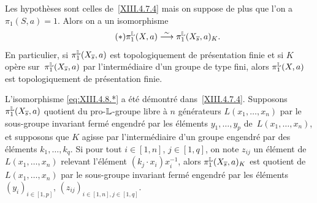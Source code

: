 \begin{corollaire} \label{XIII.4.8}
Les hypoth\`eses sont celles de~\ref{XIII.4.7.4} mais on suppose de
plus que l'on a $\pi_1(S,a)=1$. Alors on a un isomorphisme
\begin{equation*}
\label{eq:XIII.4.8.*} \tag{$*$}
{}\pi_1^{\mathbb{L}}(X,a)\overset{\sim}{\longrightarrow}\pi_1^{\mathbb{L}}(X_{\overline{s}},a)_K.
\end{equation*}
En particulier, si $\pi_1^{\mathbb{L}}(X_{\overline{s}},a)$ est topologiquement de
pr\'esentation finie et si $K$ op\`ere sur~$\pi_1^{\mathbb{L}}(X_{\overline{s}},a)$ par l'interm\'ediaire d'un groupe de type
fini, alors $\pi_1^{\mathbb{L}}(X,a)$ est topologiquement de pr\'esentation
finie.
\end{corollaire}

L'isomorphisme \eqref{eq:XIII.4.8.*} a \'et\'e d\'emontr\'e
dans~\ref{XIII.4.7.4}. Supposons $\pi_1^{\mathbb{L}}(X_{\overline{s}},a)$ quotient
du pro-$\mathbb{L}$-groupe libre \`a $n$ g\'en\'erateurs
$L(x_1,\dots,x_n)$ par le sous-groupe invariant ferm\'e engendr\'e
par les \'el\'ements $y_1,\dots,y_p$ de~$L(x_1,\dots,x_n)$, et
supposons que $K$ agisse par l'interm\'ediaire d'un groupe
engendr\'e par des \'el\'ements $k_1,\dots,k_q$. Si pour tout
$i\in[1,n]$, $j\in[1,q]$, on note $z_{ij}$ un \'el\'ement de
$L(x_1,\dots,x_n)$ relevant l'\'el\'ement $(k_j\cdot
x_i)x_i^{-1}$, alors $\pi_1^{\mathbb{L}}(X_{\overline{s}},a)_K$ est quotient de
$L(x_1,\dots,x_n)$ par le sous-groupe invariant ferm\'e engendr\'e
par les \'el\'ements $(y_i)_{i\in[1,p]}$,
$(z_{ij})_{i\in[1,n],j\in[1,q]}$.



